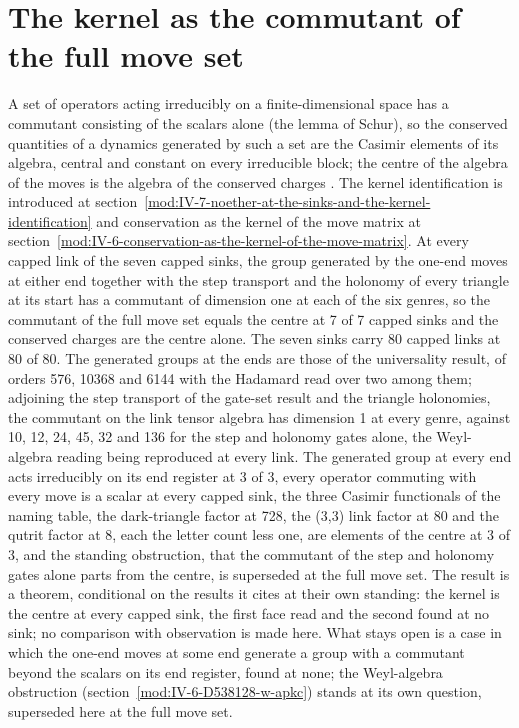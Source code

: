 \section{The kernel as the commutant of the full move set}\label{mod:IV-7-D539098-kcfm-t1}
A set of operators acting irreducibly on a finite-dimensional space has a commutant consisting of the scalars alone (the lemma of Schur), so the conserved quantities of a dynamics generated by such a set are the Casimir elements of its algebra, central and constant on every irreducible block; the centre of the algebra of the moves is the algebra of the conserved charges \cite{Schur1905,Weyl1931,Noether1918}. The kernel identification is introduced at section~\ref{mod:IV-7-noether-at-the-sinks-and-the-kernel-identification} and conservation as the kernel of the move matrix at section~\ref{mod:IV-6-conservation-as-the-kernel-of-the-move-matrix}.
At every capped link of the seven capped sinks, the group generated by the one-end moves at either end together with the step transport and the holonomy of every triangle at its start has a commutant of dimension one at each of the six genres, so the commutant of the full move set equals the centre at 7 of 7 capped sinks and the conserved charges are the centre alone.
The seven sinks carry 80 capped links at 80 of 80. The generated groups at the ends are those of the universality result, of orders 576, 10368 and 6144 with the Hadamard read over two among them; adjoining the step transport of the gate-set result and the triangle holonomies, the commutant on the link tensor algebra has dimension 1 at every genre, against 10, 12, 24, 45, 32 and 136 for the step and holonomy gates alone, the Weyl-algebra reading being reproduced at every link. The generated group at every end acts irreducibly on its end register at 3 of 3, every operator commuting with every move is a scalar at every capped sink, the three Casimir functionals of the naming table, the dark-triangle factor at 728, the (3,3) link factor at 80 and the qutrit factor at 8, each the letter count less one, are elements of the centre at 3 of 3, and the standing obstruction, that the commutant of the step and holonomy gates alone parts from the centre, is superseded at the full move set.
The result is a theorem, conditional on the results it cites at their own standing: the kernel is the centre at every capped sink, the first face read and the second found at no sink; no comparison with observation is made here.
What stays open is a case in which the one-end moves at some end generate a group with a commutant beyond the scalars on its end register, found at none; the Weyl-algebra obstruction (section~\ref{mod:IV-6-D538128-w-apkc}) stands at its own question, superseded here at the full move set.
\par\medskip{}\label{narr:close:4-7}\par
